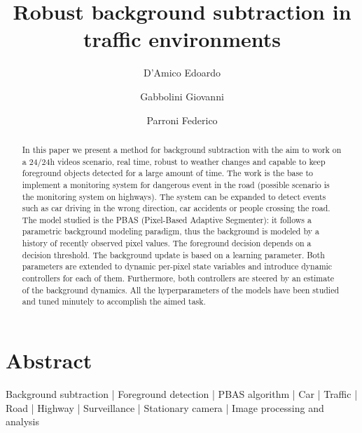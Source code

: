 
\title{Robust background subtraction in traffic environments}

\author[1 \space *]{D'Amico Edoardo}
\author[1 \space *]{Gabbolini Giovanni}
\author[1 \space *]{Parroni Federico}


\maketitle

\section*{Abstract}
\begin{abstract}
In this paper we present a method for background subtraction with the aim to work on a 24/24h videos
scenario, real time, robust to weather changes and capable to keep foreground objects detected for a
large amount of time. The work is the base to implement a monitoring system for dangerous event in
the road (possible scenario is the monitoring system on highways). The system can be expanded to
detect events such as car driving in the wrong direction, car accidents or people crossing the road.
The model studied is the PBAS (Pixel-Based Adaptive Segmenter): it follows a parametric background
modeling paradigm, thus the background is modeled by a history of recently observed pixel values.
The foreground decision depends on a decision threshold. The background update is based on a learning
parameter. Both parameters are extended to dynamic per-pixel state variables and introduce dynamic
controllers for each of them. Furthermore, both controllers are steered by an estimate of the background
dynamics. All the hyperparameters of the models have been studied and tuned minutely to accomplish the
aimed task.
\end {abstract}

\begin{keywords}
    Background subtraction | Foreground detection | PBAS algorithm | Car | Traffic | Road | Highway | Surveillance |
    Stationary camera | Image processing and analysis
\end{keywords}


